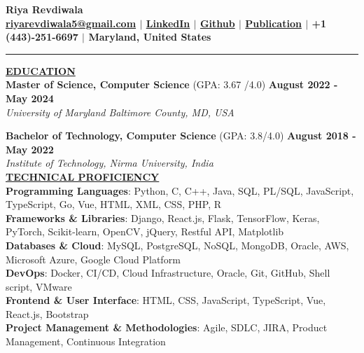 \documentclass{article}
\begin{document}
\begin{center}
\thispagestyle{empty}
\large \textbf{Riya Revdiwala \\}
\normalsize \textbf{\href{mailto:riyarevdiwala5@gmail.com}{riyarevdiwala5@gmail.com} $\mid$ \href{https://www.linkedin.com/in/riya-revdiwala/}{LinkedIn} $\mid$ \href{https://github.com/riyarevdiwala}{Github} $\mid$ \href{https://www.igi-global.com/gateway/article/304726}{Publication} $\mid$ +1 (443)-251-6697 $\mid$ Maryland, United States \\}
\rule{\textwidth}{1pt}
\end{center}


\noindent \textbf{\underline{EDUCATION}} \\
\textbf{Master of Science, Computer Science} (GPA: 3.67 /4.0)  \hfill \textbf{August 2022 - May 2024} \\
\textit{University of Maryland Baltimore County, MD, USA}\\
\begin{itemize}[noitemsep,nolistsep,leftmargin=*]
\end{itemize}
\textbf{Bachelor of Technology, Computer Science} (GPA: 3.8/4.0) \hfill \textbf{August 2018 - May 2022} \\
\textit{Institute of Technology, Nirma University, India} \\


\noindent \textbf{\underline{TECHNICAL PROFICIENCY}} \\
\textbf{Programming Languages}{: \small Python, C, C++, Java, SQL, PL/SQL, JavaScript, TypeScript, Go, Vue, HTML, XML, CSS, PHP, R} \\
\textbf{Frameworks \& Libraries}{: \small Django, React.js, Flask, TensorFlow, Keras, PyTorch, Scikit-learn, OpenCV, jQuery, Restful API, Matplotlib} \\
\textbf{Databases \& Cloud}{: \small MySQL, PostgreSQL, NoSQL, MongoDB, Oracle, AWS, Microsoft Azure, Google Cloud Platform} \\
\textbf{DevOps}{: \small  Docker, CI/CD, Cloud Infrastructure, Oracle, Git, GitHub, Shell script, VMware} \\
\textbf{Frontend \& User Interface}{: \small HTML, CSS, JavaScript, TypeScript, Vue, React.js, Bootstrap} \\
\textbf{Project Management \& Methodologies}{: \small Agile, SDLC, JIRA, Product Management, Continuous Integration} \\
\end{document}
